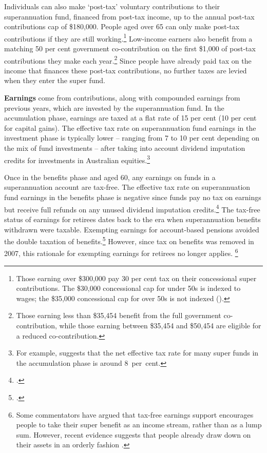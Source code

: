 Individuals can also make ‘post-tax’ voluntary contributions to their superannuation fund, financed from post-tax income, up to the annual post-tax contributions cap of \$180,000.  People aged over 65 can only make post-tax contributions if they are still working.\footnote{Those earning over \$300,000 pay 30 per cent tax on their concessional super contributions. The \$30,000 concessional cap for under 50s is indexed to wages; the \$35,000 concessional cap for over 50s is not indexed (\textcite{ATO2015ConcessionalContrCap}).}  Low-income earners also benefit from a matching 50 per cent government co-contribution on the first \$1,000 of post-tax contributions they make each year.\footnote{\textcites{ATO2015SuperCoContr}{ATO2015IncomeThresholdTest} Those earning less than \$35,454 benefit from the full government co-contribution, while those earning between \$35,454 and \$50,454 are eligible for a reduced co-contribution.} Since people have already paid tax on the income that finances these post-tax contributions, no further taxes are levied when they enter the super fund.

\textbf{Earnings} come from contributions, along with compounded earnings from previous years, which are invested by the superannuation fund. In the accumulation phase, earnings are taxed at a flat rate of 15 per cent (10 per cent for capital gains). The effective tax rate on superannuation fund earnings in the investment phase is typically lower – ranging from 7 to 10 per cent depending on the mix of fund investments – after taking into account dividend imputation credits for investments in Australian equities.\footnote{For example, \textcite[][39]{Mercer2015GlobalPensionIndex}  suggests that the net effective tax rate for many super funds in the accumulation phase is around 8~per~cent.}

Once in the benefits phase and aged 60, any earnings on funds in a superannuation account are tax-free. The effective tax rate on superannuation fund earnings in the benefits phase is negative since funds pay no tax on earnings but receive full refunds on any unused dividend imputation credits.\footcites{ATO2015RefundingImputationCredits}[][Appendix~B]{FinancialSystemsInquiry2015} The tax-free status of earnings for retirees dates back to the era when superannuation benefits withdrawn were taxable. Exempting earnings for account-based pensions avoided the double taxation of benefits.\footcite{HenryTaxReview2010} However, since tax on benefits was removed in 2007, this rationale for exempting earnings for retirees no longer applies.%
\footnote{Some commentators have argued that tax-free earnings support encourages people to take their super benefit as an income stream, rather than as a lump sum. However, recent evidence suggests that people already draw down on their assets in an orderly fashion \textcite[][16]{ProductivityCommission2015SuperPolicyPostRetirement}.} 

